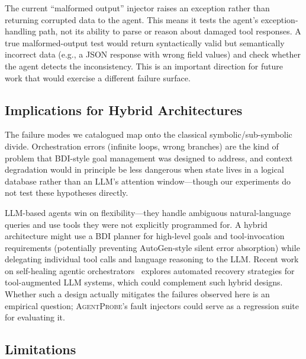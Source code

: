 \documentclass[make,article,submit,moreauthors,pdftex]{mdpi}
\providecommand{\agentprobe}{\textsc{AgentProbe}}
\begin{document}
{The current ``malformed output'' injector raises an exception rather than returning corrupted data to the agent. This means it tests the agent's exception-handling path, not its ability to parse or reason about damaged tool responses. A true malformed-output test would return syntactically valid but semantically incorrect data (e.g., a JSON response with wrong field values) and check whether the agent detects the inconsistency. This is an important direction for future work that would exercise a different failure surface.}

\subsection{Implications for Hybrid Architectures}

The failure modes we catalogued map onto the classical symbolic/sub-symbolic divide. Orchestration errors (infinite loops, wrong branches) are the kind of problem that BDI-style goal management was designed to address, and context degradation would in principle be less dangerous when state lives in a logical database rather than an LLM's attention window---though our experiments do not test these hypotheses directly.

LLM-based agents win on flexibility---they handle ambiguous natural-language queries and use tools they were not explicitly programmed for. A hybrid architecture might use a BDI planner for high-level goals and tool-invocation requirements (potentially preventing AutoGen-style silent error absorption) while delegating individual tool calls and language reasoning to the LLM. Recent work on self-healing agentic orchestrators~\cite{sureshbabu2026selfhealing} explores automated recovery strategies for tool-augmented LLM systems, which could complement such hybrid designs. Whether such a design actually mitigates the failures observed here is an empirical question; \agentprobe{}'s fault injectors could serve as a regression suite for evaluating it.

\subsection{Limitations}\label{sec:limitations}
\end{document}
